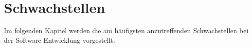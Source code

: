 \section{Schwachstellen}\label{schwachstellen}
Im folgenden Kapitel werden die am häufigsten anzutreffenden Schwachstellen bei der Software Entwicklung vorgestellt. 



